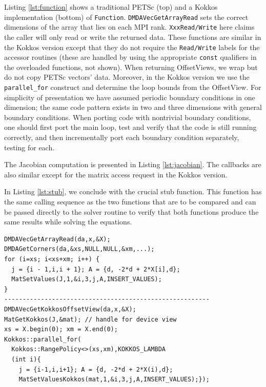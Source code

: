 \documentclass[10pt,journal,compsoc]{IEEEtran}
\begin{document}
Listing \ref{lst:function} shows a traditional PETSc (top) and a Kokkos implementation (bottom) of {\tt Function}.
{\tt DMDAVecGetArrayRead} sets the correct dimensions of the array that lies on each MPI rank. {\tt XxxRead/Write} here claims the caller will only read or write the returned data.
These functions are similar in the Kokkos version except that they do not 
require the {\tt Read/Write} labels for the accessor routines (these are handled by using the appropriate
{\tt const} qualifiers in the overloaded functions, not shown). 
When returning OffsetViews, we wrap but do not copy PETSc vectors' data.
Moreover, in the Kokkos version
we use the {\tt parallel\_for}
construct and determine the loop bounds from the OffsetView.
For simplicity of presentation we have 
assumed periodic boundary conditions in one dimension; the same code pattern exists 
in two and three dimensions with general boundary conditions.
When porting code with nontrivial boundary conditions, one should first port the main loop, test and verify that the 
code is still running correctly, and then incrementally port each boundary condition separately, testing for each. 

The Jacobian computation is presented in Listing \ref{lst:jacobian}.
The
callbacks are also similar except for the matrix access request in the
Kokkos version. 

In Listing \ref{lst:stub}, we conclude with the crucial stub function.  This function
has the same calling sequence as the two functions
that are to be compared and can be passed directly to the solver routine
to verify that both 
functions produce the same results while solving the equations. 

\begin{lstlisting}[caption={Traditional PETSc Jacobian (top) and Kokkos version (bottom)},label={lst:jacobian},frame=single,captionpos=b]
DMDAVecGetArrayRead(da,x,&X);
DMDAGetCorners(da,&xs,NULL,NULL,&xm,...);
for (i=xs; i<xs+xm; i++) {
  j = {i - 1,i,i + 1}; A = {d, -2*d + 2*X[i],d};
  MatSetValues(J,1,&i,3,j,A,INSERT_VALUES);
}
--------------------------------------------------------
DMDAVecGetKokkosOffsetView(da,x,&X);
MatGetKokkos(J,&mat); // handle for device view
xs = X.begin(0); xm = X.end(0);
Kokkos::parallel_for(
  Kokkos::RangePolicy<>(xs,xm),KOKKOS_LAMBDA 
  (int i){
    j = {i-1,i,i+1}; A = {d, -2*d + 2*X(i),d};
    MatSetValuesKokkos(mat,1,&i,3,j,A,INSERT_VALUES);});
\end{lstlisting}
\end{document}
